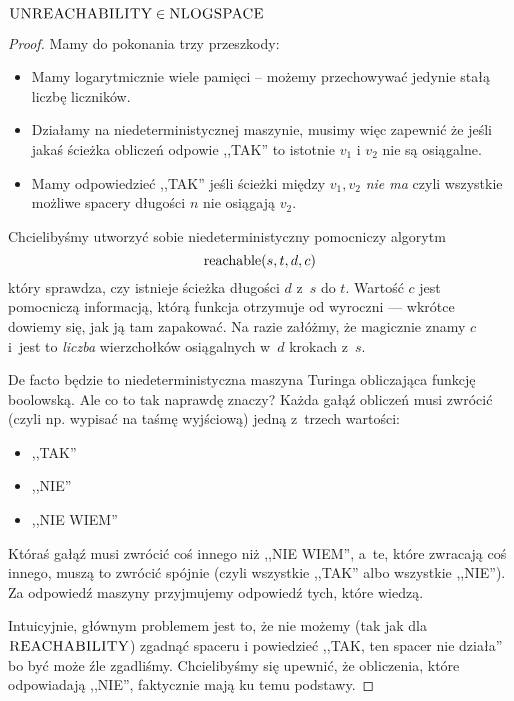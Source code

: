 \begin{theorem}
    \( \textsc{UNREACHABILITY} \in \textsc{NLOGSPACE} \)
\end{theorem}
\begin{proof}
    Mamy do pokonania trzy przeszkody:
    \begin{itemize}
        \item Mamy logarytmicznie wiele pamięci -- możemy przechowywać jedynie stałą liczbę liczników.
        
        \item Działamy na niedeterministycznej maszynie, musimy więc zapewnić że jeśli jakaś ścieżka obliczeń odpowie ,,TAK'' to istotnie \( v_1 \) i \( v_2 \) nie są osiągalne.
        
        \item Mamy odpowiedzieć ,,TAK'' jeśli ścieżki między \( v_1, v_2 \) \textit{nie ma} czyli wszystkie możliwe spacery długości \( n \) nie osiągają \( v_2 \).
    \end{itemize}
    
    Chcielibyśmy utworzyć sobie niedeterministyczny pomocniczy algorytm
    \[
        \textrm{reachable}\pars{s, t, d, c}
    \]
    który sprawdza, czy istnieje ścieżka długości \(d\) z~\(s\) do \(t\). Wartość \(c\) jest pomocniczą informacją, którą funkcja otrzymuje od wyroczni --- wkrótce dowiemy się, jak ją tam zapakować. Na razie załóżmy, że magicznie znamy \(c\) i~jest to \emph{liczba} wierzchołków osiągalnych w~\(d\) krokach z~\(s\).
    
    De facto będzie to niedeterministyczna maszyna Turinga obliczająca funkcję boolowską. Ale co to tak naprawdę znaczy? Każda gałąź obliczeń musi zwrócić (czyli np. wypisać na taśmę wyjściową) jedną z~trzech wartości:
    \begin{itemize}
        \item ,,TAK''
        \item ,,NIE''
        \item ,,NIE WIEM''
    \end{itemize}
    Któraś gałąź musi zwrócić coś innego niż ,,NIE WIEM'', a~te, które zwracają coś innego, muszą to zwrócić spójnie (czyli wszystkie ,,TAK'' albo wszystkie ,,NIE''). Za odpowiedź maszyny przyjmujemy odpowiedź tych, które wiedzą.
    
    Intuicyjnie, głównym problemem jest to, że nie możemy (tak jak dla \(\textsc{REACHABILITY}\)) zgadnąć spaceru i powiedzieć ,,TAK, ten spacer nie działa'' bo być może źle zgadliśmy. Chcielibyśmy się upewnić, że obliczenia, które odpowiadają ,,NIE'', faktycznie mają ku temu podstawy.
    

\end{proof}

